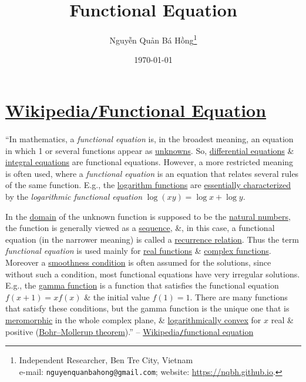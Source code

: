 \documentclass{article}
\title{Functional Equation}
\author{Nguyễn Quản Bá Hồng\footnote{Independent Researcher, Ben Tre City, Vietnam\\e-mail: \texttt{nguyenquanbahong@gmail.com}; website: \url{https://nqbh.github.io}.}}
\date{\today}
\numberwithin{equation}{section}
\begin{document}
\maketitle
\begin{abstract}
	
\end{abstract}
\setcounter{secnumdepth}{4}
\setcounter{tocdepth}{3}
\tableofcontents
\newpage


\section{\href{https://en.wikipedia.org/wiki/Functional_equation}{Wikipedia\texttt{/}Functional Equation}}
``In mathematics, a \textit{functional equation} is, in the broadest meaning, an equation in which 1 or several functions appear as \href{https://en.wikipedia.org/wiki/Unknown_(mathematics)}{unknowns}. So, \href{https://en.wikipedia.org/wiki/Differential_equation}{differential equations} \& \href{https://en.wikipedia.org/wiki/Integral_equation}{integral equations} are functional equations. However, a more restricted meaning is often used, where a \textit{functional equation} is an equation that relates several rules of the same function. E.g., the \href{https://en.wikipedia.org/wiki/Logarithm_function}{logarithm functions} are \href{https://en.wikipedia.org/wiki/Logarithm#Characterization_by_the_product_formula}{essentially characterized} by the \textit{logarithmic functional equation} $\log(xy) = \log x + \log y$.

In the \href{https://en.wikipedia.org/wiki/Domain_of_a_function}{domain} of the unknown function is supposed to be the \href{https://en.wikipedia.org/wiki/Natural_number}{natural numbers}, the function is generally viewed as a \href{https://en.wikipedia.org/wiki/Sequence_(mathematics)}{sequence}, \&, in this case, a functional equation (in the narrower meaning) is called a \href{https://en.wikipedia.org/wiki/Recurrence_relation}{recurrence relation}. Thus the term \textit{functional equation} is used mainly for \href{https://en.wikipedia.org/wiki/Real_function}{real functions} \& \href{https://en.wikipedia.org/wiki/Complex_function}{complex functions}. Moreover a \href{https://en.wikipedia.org/wiki/Smooth_function}{smoothness condition} is often assumed for the solutions, since without such a condition, most functional equations have very irregular solutions. E.g., the \href{https://en.wikipedia.org/wiki/Gamma_function}{gamma function} is a function that satisfies the functional equation $f(x + 1) = xf(x)$ \& the initial value $f(1) = 1$. There are many functions that satisfy these conditions, but the gamma function is the unique one that is \href{https://en.wikipedia.org/wiki/Meromorphic_function}{meromorphic} in the whole complex plane, \& \href{https://en.wikipedia.org/wiki/Logarithmically_convex_function}{logarithmically convex} for $x$ real \& positive (\href{https://en.wikipedia.org/wiki/Bohr%E2%80%93Mollerup_theorem}{Bohr--Mollerup theorem}).'' -- \href{https://en.wikipedia.org/wiki/Functional_equation}{Wikipedia\texttt{/}functional equation}
\end{document}
